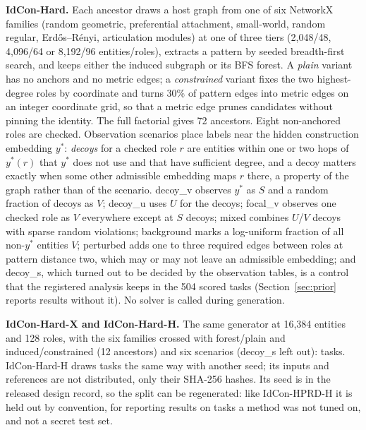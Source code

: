 

\textbf{IdCon-Hard.} Each ancestor draws a host graph from one of six NetworkX families \cite{networkx} (random geometric, preferential attachment, small-world, random regular, Erd\H{o}s--R\'enyi, articulation modules) at one of three tiers (2,048/48, 4,096/64 or 8,192/96 entities/roles), extracts a pattern by seeded breadth-first search, and keeps either the induced subgraph or its BFS forest. A \emph{plain} variant has no anchors and no metric edges; a \emph{constrained} variant fixes the two highest-degree roles by coordinate and turns 30\% of pattern edges into metric edges on an integer coordinate grid, so that a metric edge prunes candidates without pinning the identity. The full factorial gives 72 ancestors. Eight non-anchored roles are checked. Observation scenarios place labels near the hidden construction embedding $y^*$: \emph{decoys} for a checked role $r$ are entities within one or two hops of $y^*(r)$ that $y^*$ does not use and that have sufficient degree, and a decoy matters exactly when some other admissible embedding maps $r$ there, a property of the graph rather than of the scenario. \textsf{decoy\_v} observes $y^*$ as $S$ and a random fraction of decoys as $V$; \textsf{decoy\_u} uses $U$ for the decoys; \textsf{focal\_v} observes one checked role as $V$ everywhere except at $S$ decoys; \textsf{mixed} combines $U$/$V$ decoys with sparse random violations; \textsf{background} marks a log-uniform fraction of all non-$y^*$ entities $V$; \textsf{perturbed} adds one to three required edges between roles at pattern distance two, which may or may not leave an admissible embedding; and \textsf{decoy\_s}, which turned out to be decided by the observation tables, is a control that the registered analysis keeps in the 504 scored tasks (Section~\ref{sec:prior} reports results without it). No solver is called during generation.

\textbf{IdCon-Hard-X and IdCon-Hard-H.} The same generator at 16,384 entities and 128 roles, with the six families crossed with forest/plain and induced/constrained (12 ancestors) and six scenarios (\textsf{decoy\_s} left out): \hardxTasks{} tasks. IdCon-Hard-H draws \hardhTasks{} tasks the same way with another seed; its inputs and references are not distributed, only their SHA-256 hashes. Its seed is in the released design record, so the split can be regenerated: like IdCon-HPRD-H it is held out by convention, for reporting results on tasks a method was not tuned on, and not a secret test set.

